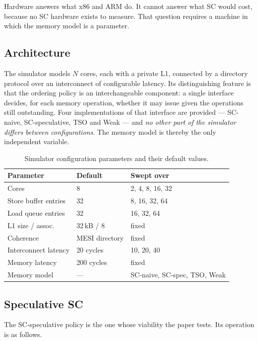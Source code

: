 Hardware answers what x86 and ARM do.
It cannot answer what SC would cost, because
no SC hardware exists to measure.
That question requires a machine in which the
memory model is a parameter.

\subsection{Architecture}

The simulator models $N$ cores, each with a private L1, connected by a directory
protocol over an interconnect of configurable latency.
Its distinguishing feature
is that the ordering policy is an interchangeable component: a single interface
decides, for each memory operation, whether it may issue given the operations
still outstanding.
Four implementations of that interface are provided --- SC-naive,
SC-speculative, TSO and Weak --- and \emph{no other part of the simulator differs
between configurations}.
The memory model is thereby the only independent variable.

\begin{table}[H]
\centering
\small
\caption{Simulator configuration parameters and their default values.}
\label{tab:simconfig}
\begin{tabular}{@{}lll@{}}
\toprule
\textbf{Parameter} & \textbf{Default} & \textbf{Swept over} \\
\midrule
Cores                & 8            & 2, 4, 8, 16, 32 \\
Store buffer entries & 32           & 8, 16, 32, 64 \\
Load queue entries   & 32           & 16, 32, 64 \\
L1 size / assoc.     & 32\,kB / 8   & fixed \\
Coherence            & MESI directory & fixed \\
Interconnect latency & 20 cycles    & 10, 20, 40 \\
Memory latency       & 200 cycles   & fixed \\
Memory model         & ---          & SC-naive, SC-spec, TSO, Weak \\
\bottomrule
\end{tabular}
\end{table}

\subsection{Speculative SC}

The SC-speculative policy is the one whose viability the paper tests.
Its
operation is as follows.

